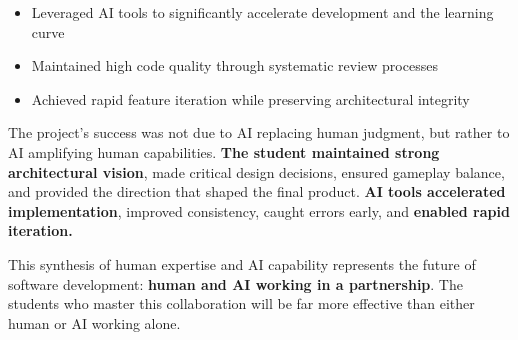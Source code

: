 \documentclass[12pt,a4paper]{article}
\begin{document}
\begin{itemize}
    \item Leveraged AI tools to significantly accelerate development and the learning curve
    \item Maintained high code quality through systematic review processes
    \item Achieved rapid feature iteration while preserving architectural integrity
\end{itemize}

The project's success was not due to AI replacing human judgment, but rather to AI amplifying human capabilities. \textbf{The student maintained strong architectural vision}, made critical design decisions, ensured gameplay balance, and provided the direction that shaped the final product. \textbf{AI tools accelerated implementation}, improved consistency, caught errors early, and \textbf{enabled rapid iteration.}

This synthesis of human expertise and AI capability represents the future of software development: \textbf{human and AI working in a partnership}. The students who master this collaboration will be far more effective than either human or AI working alone.

\newpage
\end{document}
